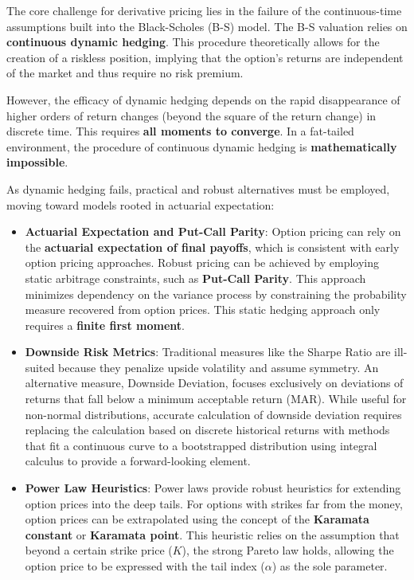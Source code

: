 \documentclass{ieeetj}
\begin{document}
The core challenge for derivative pricing lies in the failure of the continuous-time assumptions built into the Black-Scholes (B-S) model. The B-S valuation relies on \textbf{continuous dynamic hedging}. This procedure theoretically allows for the creation of a riskless position, implying that the option's returns are independent of the market and thus require no risk premium.

However, the efficacy of dynamic hedging depends on the rapid disappearance of higher orders of return changes (beyond the square of the return change) in discrete time. This requires \textbf{all moments to converge}. In a fat-tailed environment, the procedure of continuous dynamic hedging is \textbf{mathematically impossible}.

As dynamic hedging fails, practical and robust alternatives must be employed, moving toward models rooted in actuarial expectation:

\begin{itemize}
    \item \textbf{Actuarial Expectation and Put-Call Parity}: Option pricing can rely on the \textbf{actuarial expectation of final payoffs}, which is consistent with early option pricing approaches. Robust pricing can be achieved by employing static arbitrage constraints, such as \textbf{Put-Call Parity}. This approach minimizes dependency on the variance process by constraining the probability measure recovered from option prices. This static hedging approach only requires a \textbf{finite first moment}.
    
    \item \textbf{Downside Risk Metrics}: Traditional measures like the Sharpe Ratio are ill-suited because they penalize upside volatility and assume symmetry. An alternative measure, Downside Deviation, focuses exclusively on deviations of returns that fall below a minimum acceptable return (MAR). While useful for non-normal distributions, accurate calculation of downside deviation requires replacing the calculation based on discrete historical returns with methods that fit a continuous curve to a bootstrapped distribution using integral calculus to provide a forward-looking element.

    \item  \textbf{Power Law Heuristics}: Power laws provide robust heuristics for extending option prices into the deep tails. For options with strikes far from the money, option prices can be extrapolated using the concept of the \textbf{Karamata constant} or \textbf{Karamata point}. This heuristic relies on the assumption that beyond a certain strike price ($K$), the strong Pareto law holds, allowing the option price to be expressed with the tail index ($\alpha$) as the sole parameter.
\end{itemize}
\end{document}
